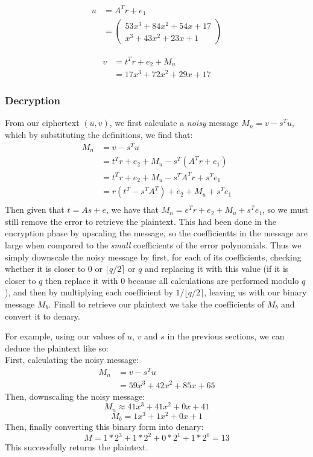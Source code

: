 \documentclass{article}
\newcommand{\round}[1]{\ensuremath{\lfloor#1\rceil}}
\begin{document}
\begin{align*}
u &= A^{T}r + e_{1} \\
&=
\begin{pmatrix}%
53x^3 + 84x^2 + 54x + 17 \\
x^3 + 43x^2 + 23x + 1
\end{pmatrix}
\end{align*}

\begin{align*}
v &= t^{T}r + e_{2} + M_{u} \\
&= 17x^3 + 72x^2 + 29x + 17
\end{align*}

\subsubsection{Decryption}
From our ciphertext $(u, v)$, we first calculate a \textit{noisy} message $M_{n} = v - s^{T}u$,
which by substituting the definitions, we find that:
\begin{align}
   M_{n} &= v - s^{T}u \\
         &= t^{T}r + e_{2} + M_{u} - s^{T}(A^{T}r + e_{1}) \\
         &= t^{T}r + e_{2} + M_{u} - s^{T}A^{T}r + s^{T}e_{1} \\
         &= r(t^{T} - s^{T}A^{T}) + e_{2} + M_{u} + s^{T}e_{1} \\
\end{align}
Then given that $t = As + e$, we have that $M_{n} = e^{T}r + e_{2} + M_{u} + s^{T}e_{1}$, so we must still remove the error to retrieve
the plaintext. This had been done in the encryption phase by upscaling the message, so the coefficientts in the message are large when
compared to the \textit{small} coefficients of the error polynomials. Thus we simply downscale the noisy message by first, for each of its
coefficients, checking whether it is closer to 0 or $\round{q/2}$ or $q$ and replacing it with this value (if it is closer to $q$ then replace
it with 0 because all calculations are performed modulo $q$), and then by multiplying each coefficient by $1/\round{q/2}$, leaving us with
our binary message $M_{b}$. Finall to retrieve our plaintext we take the coefficients of $M_{b}$ and convert it to denary.

For example, using our values of $u$, $v$ and $s$ in the previous sections, we can deduce the plaintext like so:
\\
First, calculating the noisy message:
\begin{align*}
M_{n} &= v - s^{T}u \\
&= 59x^{3} + 42x^{2} + 85x + 65
\end{align*}
Then, downscaling the noisy message:
\[M_{n} \approx 41x^{3} + 41x^{2} + 0x + 41\]
\[M_{b} = 1x^{3} + 1x^{2} + 0x + 1\]
Then, finally converting this binary form into denary:
\[M = 1 * 2^{3} + 1 * 2^{2} + 0 * 2^{1} + 1 * 2^{0} = 13\]
This successfully returns the plaintext.
\end{document}
